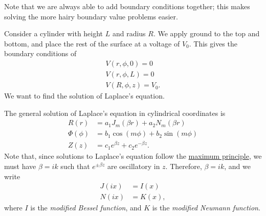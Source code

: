 \documentclass[10pt]{mypackage}
\begin{document}
  Note that we are always able to add boundary conditions together; this makes solving the more hairy boundary value problems easier.
  \begin{example}
    Consider a cylinder with height $L$ and radius $R$. We apply ground to the top and bottom, and place the rest of the surface at a voltage of $V_0$. This gives the boundary conditions of
    \begin{align*}
      V\left( r,\phi,0 \right) = 0\\
      V\left( r,\phi,L \right) = 0\\
      V\left( R,\phi,z \right) = V_0.
    \end{align*}
    We want to find the solution of Laplace's equation.\newline

    The general solution of Laplace's equation in cylindrical coordinates is
    \begin{align*}
      R(r) &= a_1J_m\left( \beta r \right) + a_2N_m\left( \beta r \right)\\
      \Phi(\phi) &= b_1\cos\left( m\phi \right) + b_2\sin\left( m\phi \right)\\
      Z(z) &= c_1e^{\beta z} + c_2e^{-\beta z}.
    \end{align*}
    Note that, since solutions to Laplace's equation follow the \href{https://en.wikipedia.org/wiki/Maximum_principle}{maximum principle}, we must have $\beta = ik$ such that $e^{\pm\beta z}$ are oscillatory in $z$. Therefore, $\beta = ik$, and we write
    \begin{align*}
      J\left( ix \right) &= I(x)\\
      N\left( ix \right) &= K(x),
    \end{align*}
    where $I$ is the \textit{modified Bessel function}, and $K$ is the \textit{modified Neumann function}.\newline


\end{example}
\end{document}
